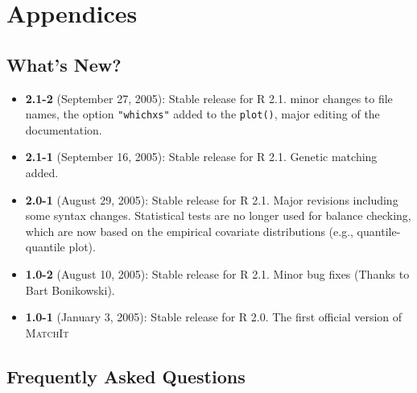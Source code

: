 \documentclass[oneside,letterpaper,12pt]{book}
\newcommand{\MatchIt}{\textsc{MatchIt}}
\begin{document}

\chapter{Appendices}

\section{What's New?}

\begin{itemize}
\item \textbf{2.1-2} (September 27, 2005): Stable release for R 2.1.
  minor changes to file names, the option {\tt "whichxs"} added to the
  {\tt plot()}, major editing of the documentation.
\item \textbf{2.1-1} (September 16, 2005): Stable release for R
  	2.1. Genetic matching added.	
\item \textbf{2.0-1} (August 29, 2005): Stable release for R 2.1.
  Major revisions including some syntax changes. Statistical tests are
  no longer used for balance checking, which are now based on the
  empirical covariate distributions (e.g., quantile-quantile plot).
\item \textbf{1.0-2} (August 10, 2005): Stable release for R
  2.1. Minor bug fixes (Thanks to Bart Bonikowski).
\item \textbf{1.0-1} (January 3, 2005): Stable release for R 2.0. The
  first official version of \MatchIt
\end{itemize}



\section{Frequently Asked Questions}

%
\end{document}
